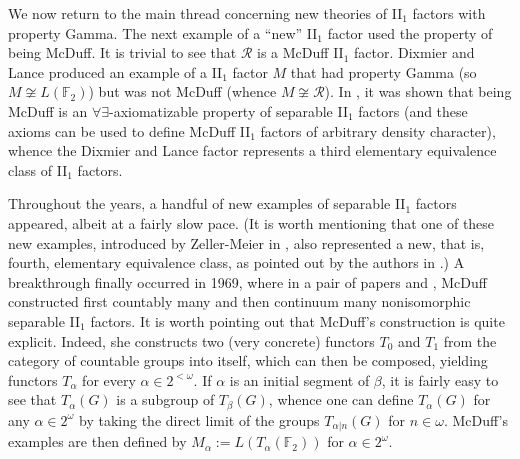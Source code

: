 \documentclass[12pt]{amsart}
\theoremstyle{definition}
\newtheorem{question}[thm]{Question}
\def\bb{\mathbb}
\def\bb{\mathbb}
\def\cal{\mathcal}
\def\u{\mathsf 1}
\def \R{\mathcal R}
\def \u{\mathcal U}
\begin{document}


We now return to the main thread concerning new theories of II$_1$ factors with property Gamma.  The next example of a ``new'' II$_1$ factor used the property of being McDuff.  It is trivial to see that $\R$ is a McDuff II$_1$ factor.  Dixmier and Lance \cite{DL} produced an example of a II$_1$ factor $M$ that had property Gamma (so $M\not\cong L(\bb F_2)$) but was not McDuff (whence $M\not\cong \R$).  In \cite[Proposition 3.9]{mtoa3}, it was shown that being McDuff is an $\forall\exists$-axiomatizable property of separable II$_1$ factors (and these axioms can be used to define McDuff II$_1$ factors of arbitrary density character), whence the Dixmier and Lance factor represents a third elementary equivalence class of II$_1$ factors.

Throughout the years, a handful of new examples of separable II$_1$ factors appeared, albeit at a fairly slow pace.  (It is worth mentioning that one of these new examples, introduced by Zeller-Meier in \cite{ZM}, also represented a new, that is, fourth, elementary equivalence class, as pointed out by the authors in \cite{GHgames}.)  A breakthrough finally occurred in 1969, where in a pair of papers \cite{McD1} and \cite{McD2}, McDuff constructed first countably many and then continuum many nonisomorphic separable II$_1$ factors.  It is worth pointing out that McDuff's construction is quite explicit.  Indeed, she constructs two (very concrete) functors $T_0$ and $T_1$ from the category of countable groups into itself, which can then be composed, yielding functors $T_\alpha$ for every $\alpha\in 2^{<\omega}$.  If $\alpha$ is an initial segment of $\beta$, it is fairly easy to see that $T_\alpha(G)$ is a subgroup of $T_\beta(G)$, whence one can define $T_\alpha(G)$ for any $\alpha\in 2^{\omega}$ by taking the direct limit of the groups $T_{\alpha|n}(G)$ for $n\in \omega$.  McDuff's examples are then defined by $M_\alpha:=L(T_\alpha(\bb F_2))$ for $\alpha\in 2^\omega$.
\end{document}
